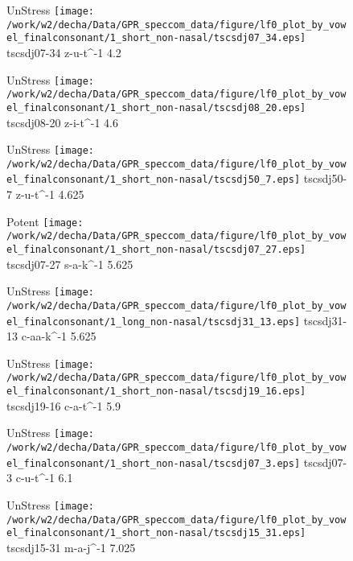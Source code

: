 \documentclass{article}
\begin{document}
\begin{figure}[t]
\begin{minipage}[b]{.24\textwidth}
UnStress
\centering
\texttt{[image: /work/w2/decha/Data/GPR\_speccom\_data/figure/lf0\_plot\_by\_vowel\_finalconsonant/1\_short\_non-nasal/tscsdj07\_34.eps]}
tscsdj07-34 z-u-t\textasciicircum-1 4.2
\end{minipage}
\begin{minipage}[b]{.24\textwidth}
UnStress
\centering
\texttt{[image: /work/w2/decha/Data/GPR\_speccom\_data/figure/lf0\_plot\_by\_vowel\_finalconsonant/1\_short\_non-nasal/tscsdj08\_20.eps]}
tscsdj08-20 z-i-t\textasciicircum-1 4.6
\end{minipage}
\begin{minipage}[b]{.24\textwidth}
UnStress
\centering
\texttt{[image: /work/w2/decha/Data/GPR\_speccom\_data/figure/lf0\_plot\_by\_vowel\_finalconsonant/1\_short\_non-nasal/tscsdj50\_7.eps]}
tscsdj50-7 z-u-t\textasciicircum-1 4.625
\end{minipage}
\begin{minipage}[b]{.24\textwidth}
\colorbox{Apricot}{Potent}
\centering
\texttt{[image: /work/w2/decha/Data/GPR\_speccom\_data/figure/lf0\_plot\_by\_vowel\_finalconsonant/1\_short\_non-nasal/tscsdj07\_27.eps]}
tscsdj07-27 s-a-k\textasciicircum-1 5.625
\end{minipage}
\end{figure}

\begin{figure}[t]
\begin{minipage}[b]{.24\textwidth}
UnStress
\centering
\texttt{[image: /work/w2/decha/Data/GPR\_speccom\_data/figure/lf0\_plot\_by\_vowel\_finalconsonant/1\_long\_non-nasal/tscsdj31\_13.eps]}
tscsdj31-13 c-aa-k\textasciicircum-1 5.625
\end{minipage}
\begin{minipage}[b]{.24\textwidth}
UnStress
\centering
\texttt{[image: /work/w2/decha/Data/GPR\_speccom\_data/figure/lf0\_plot\_by\_vowel\_finalconsonant/1\_short\_non-nasal/tscsdj19\_16.eps]}
tscsdj19-16 c-a-t\textasciicircum-1 5.9
\end{minipage}
\begin{minipage}[b]{.24\textwidth}
UnStress
\centering
\texttt{[image: /work/w2/decha/Data/GPR\_speccom\_data/figure/lf0\_plot\_by\_vowel\_finalconsonant/1\_short\_non-nasal/tscsdj07\_3.eps]}
tscsdj07-3 c-u-t\textasciicircum-1 6.1
\end{minipage}
\begin{minipage}[b]{.24\textwidth}
UnStress
\centering
\texttt{[image: /work/w2/decha/Data/GPR\_speccom\_data/figure/lf0\_plot\_by\_vowel\_finalconsonant/1\_short\_non-nasal/tscsdj15\_31.eps]}
tscsdj15-31 m-a-j\textasciicircum-1 7.025
\end{minipage}
\end{figure}
\end{document}

